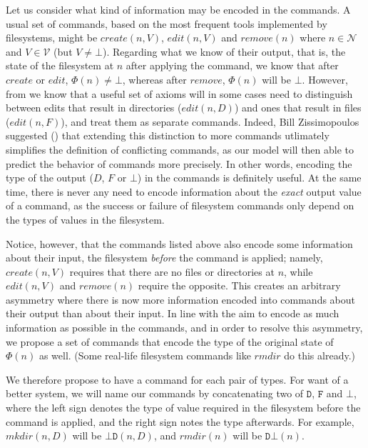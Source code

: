 \documentclass[12pt]{article}
\newcommand{\setv}{\mathcal{V}} %
\newcommand{\setn}{\mathcal{N}} %
\newcommand{\empt}{\bot}
\newcommand{\FS}{\Phi} %
\newcommand{\fscommand}[2]{{#1#2}}
\newcommand{\fsregcommandchar}[1]{\mathtt{#1}}
\newcommand{\fsregcommand}[2]{\fscommand{\fsregcommandchar{#1}}{\fsregcommandchar{#2}}}
\newcommand{\cbd}{\fsregcommand{\empt}{D}}
\newcommand{\cdb}{\fsregcommand{D}{\empt}}
\theoremstyle{definition}
\begin{document}
Let us consider what kind of information may be encoded in the commands.
A usual set of commands, based on the most frequent tools implemented by filesystems,
might be $create(n,V)$, $edit(n,V)$ and $remove(n)$ where $n\in\setn$ and $V\in\setv$ (but $V\neq\empt$).
Regarding what we know of their output, that is, the state of the filesystem at $n$
after applying the command,
we know that after $create$ or $edit$, $\FS(n)\neq\empt$, whereas after $remove$,
$\FS(n)$ will be $\empt$. 
However, from \cite{NREC:alg} we know that a useful set of axioms
will in some cases need to distinguish between edits that result in directories ($edit(n,D)$) and
ones that result in files ($edit(n,F)$), and treat them as separate commands.
Indeed, Bill Zissimopoulos suggested (\cite{BZ}) that extending this distinction to more commands
utlimately simplifies
the definition of conflicting commands, as our model will then able to predict the behavior of commands
more precisely.
In other words, encoding the type of the output ($D$, $F$ or $\empt$) in the commands is definitely useful.
At the same time, there is never any need to encode information about the
\emph{exact} output value of a command,
as the success or failure of filesystem commands only depend on the types of values in the filesystem.

Notice, however, that the commands listed above also encode some information about 
their input, the filesystem
\emph{before} the command is applied; namely, $create(n,V)$ requires that there are no files
or directories at $n$, while $edit(n,V)$ and $remove(n)$ require the opposite.
This creates an arbitrary asymmetry where
there is now more information encoded into commands about their output than about their input.
In line with the aim to encode as much information as possible in the commands, %
and in order to resolve this asymmetry, we propose a set of commands that encode
the type of the original state of $\FS(n)$ as well.
(Some real-life filesystem commands like $rmdir$ do this already.)

We therefore propose to have a command for each pair of types.
For want of a better system, we will name our commands by concatenating
two of $\fsregcommandchar{D}$, $\fsregcommandchar{F}$ and $\fsregcommandchar{\empt}$, 
where the left sign denotes the type of value
required in the filesystem before the command is applied, and the right sign notes the type
afterwards. For example, $mkdir(n,D)$ will be $\cbd(n,D)$, and $rmdir(n)$ will be $\cdb(n)$.
\end{document}
